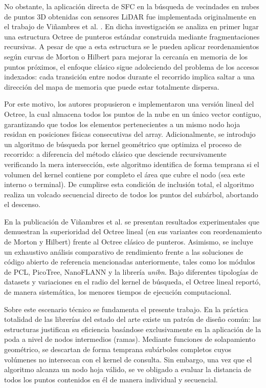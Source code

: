 No obstante, la aplicación directa de SFC en la búsqueda de vecindades en nubes de puntos 3D obtenidas con sensores LiDAR fue implementada originalmente en el trabajo de Viñambres et al. \cite{Vinambres}. En dicha investigación se analiza en primer lugar una estructura Octree de punteros estándar construida mediante fragmentaciones recursivas. A pesar de que a esta estructura se le pueden aplicar reordenamientos según curvas de Morton o Hilbert para mejorar la cercanía en memoria de los puntos próximos, el enfoque clásico sigue adoleciendo del problema de los accesos indexados: cada transición entre nodos durante el recorrido implica saltar a una dirección del mapa de memoria que puede estar totalmente dispersa.

Por este motivo, los autores propusieron e implementaron una versión lineal del Octree, la cual almacena todos los puntos de la nube en un único vector contiguo, garantizando que todos los elementos pertenecientes a un mismo nodo hoja residan en posiciones físicas consecutivas del array. Adicionalmente, se introdujo un algoritmo de búsqueda por kernel geométrico que optimiza el proceso de recorrido: a diferencia del método clásico que desciende recursivamente verificando la mera intersección, este algoritmo identifica de forma temprana si el volumen del kernel contiene por completo el área que cubre el nodo (sea este interno o terminal). De cumplirse esta condición de inclusión total, el algoritmo realiza un volcado secuencial directo de todos los puntos del subárbol, abortando el descenso.

En la publicación de Viñambres et al. \cite{Vinambres} se presentan resultados experimentales que demuestran la superioridad del Octree lineal (en sus variantes con reordenamiento de Morton y Hilbert) frente al Octree clásico de punteros. Asimismo, se incluye un exhaustivo análisis comparativo de rendimiento frente a las soluciones de código abierto de referencia mencionadas anteriormente, tales como los módulos de PCL, PicoTree, NanoFLANN y la librería \textit{unibn}. Bajo diferentes tipologías de datasets y variaciones en el radio del kernel de búsqueda, el Octree lineal reportó, de manera sistemática, los menores tiempos de ejecución computacional.

Sobre este escenario técnico se fundamenta el presente trabajo. En la práctica totalidad de las librerías del estado del arte existe un patrón de diseño común: las estructuras justifican su eficiencia basándose exclusivamente en la aplicación de la poda a nivel de nodos intermedios (ramas). Mediante funciones de solapamiento geométrico, se descartan de forma temprana subárboles completos cuyos volúmenes no intersecan con el kernel de consulta. Sin embargo, una vez que el algoritmo alcanza un nodo hoja válido, se ve obligado a evaluar la distancia de todos los puntos contenidos en él de manera individual y secuencial.

